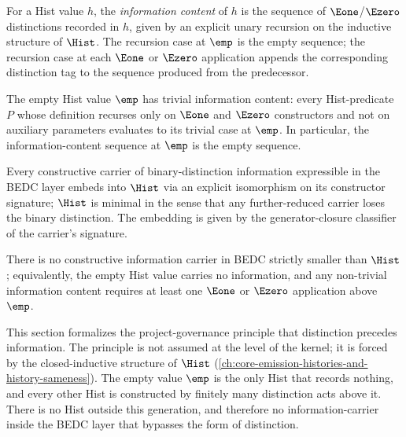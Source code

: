 \begin{definition}
\label{def:hist-information-content}
For a Hist value \(h\), the \emph{information content} of \(h\) is the sequence of \(\Eone\)/\(\Ezero\) distinctions recorded in \(h\), given by an explicit unary recursion on the inductive structure of \(\Hist\). The recursion case at \(\emp\) is the empty sequence; the recursion case at each \(\Eone\) or \(\Ezero\) application appends the corresponding distinction tag to the sequence produced from the predecessor.
\end{definition}
\begin{theorem}
\label{thm:pre-distinction-void}
The empty Hist value \(\emp\) has trivial information content: every Hist-predicate \(P\) whose definition recurses only on \(\Eone\) and \(\Ezero\) constructors and not on auxiliary parameters evaluates to its trivial case at \(\emp\). In particular, the information-content sequence at \(\emp\) is the empty sequence.
\end{theorem}
\begin{theorem}
\label{thm:hist-minimal-carrier}
Every constructive carrier of binary-distinction information expressible in the BEDC layer embeds into \(\Hist\) via an explicit isomorphism on its constructor signature; \(\Hist\) is minimal in the sense that any further-reduced carrier loses the binary distinction. The embedding is given by the generator-closure classifier of the carrier's signature.
\end{theorem}
\begin{corollary}
\label{cor:information-requires-distinction}
There is no constructive information carrier in BEDC strictly smaller than \(\Hist\); equivalently, the empty Hist value carries no information, and any non-trivial information content requires at least one \(\Eone\) or \(\Ezero\) application above \(\emp\).
\end{corollary}
\begin{remark}[Reading]
\label{rem:distinction-foundationalism-reading}
This section formalizes the project-governance principle that distinction precedes information. The principle is not assumed at the level of the kernel; it is forced by the closed-inductive structure of \(\Hist\) (\autoref{ch:core-emission-histories-and-history-sameness}). The empty value \(\emp\) is the only Hist that records nothing, and every other Hist is constructed by finitely many distinction acts above it. There is no Hist outside this generation, and therefore no information-carrier inside the BEDC layer that bypasses the form of distinction.
\end{remark}

